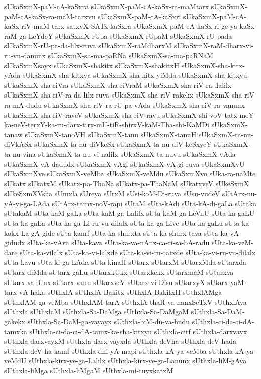 {sUkaSxmX-paM-cA-kaSxra
sUkaSxmX-paM-cA-kaSx-ra-maMtarx
sUkaSxmX-paM-cA-kaSx-ra-maM-tarxvu
sUkaSxmX-paM-cA-kaSxri
sUkaSxmX-paM-cA-kaSx-riV-maM-tarx-satxvX-SATx-kaSxra
sUkaSxmX-paM-cA-kaSx-ri-ge-ya-kaSx-raM-ga-LeYdeY
sUkaSxmX-rUpa
sUkaSxmX-rUpaM
sUkaSxmX-rU-pada
sUkaSxmX-rU-pa-da-lilx-ruva
sUkaSxmX-raMdharxM
sUkaSxmX-raM-dharx-vi-ru-vu-danunx
sUkaSxmX-sa-ma-paRNa
sUkaSxmX-sa-ma-paRNaM
sUkaSxmXsayx
sUkaSxmX-shakitx
sUkaSxmX-shakitxH
sUkaSxmX-sha-kitx-yAda
sUkaSxmX-sha-kitxya
sUkaSxmX-sha-kitx-yiMda
sUkaSxmX-sha-kitxyu
sUkaSxmX-sha-riVra
sUkaSxmX-sha-riVraM
sUkaSxmX-sha-riV-ra-dalilx
sUkaSxmX-sha-riV-ra-da-lilx-ruva
sUkaSxmX-sha-riV-rakekx
sUkaSxmX-sha-riV-ra-mA-dudu
sUkaSxmX-sha-riV-ra-rU-pa-vAda
sUkaSxmX-sha-riV-ra-vanunx
sUkaSxmX-sha-riV-raveV
sUkaSxmX-sha-riV-ravu
sUkaSxmX-shi-voV-tatx-meY-ka-neV-terxY-ka-ru-darx-tirx-mU-tiR-shirxV-kaM-Tha-shi-KaMDi
sUkaSxmX-tanaw
sUkaSxmX-tanoVH
sUkaSxmX-tanu
sUkaSxmX-tanuH
sUkaSxmX-ta-nu-diVkASx
sUkaSxmX-ta-nu-diVkeSx
sUkaSxmX-ta-nu-diV-keSxyeY
sUkaSxmX-ta-nu-vina
sUkaSxmX-ta-nu-vi-nalilx
sUkaSxmX-ta-nuvu
sUkaSxmX-vAda
sUkaSxmX-vA-dadudx
sUkaSxmX-vAgi
sUkaSxmX-vA-gi-ruva
sUkaSxmXvU
sUkaSxmXve
sUkaSxmX-veMba
sUkaSxmX-veMdu
sUkaSxmXvo
sUka-ra-naMte
sUkatx
sUkatxM
sUkatx-pa-ThaNa
sUkatx-pa-ThaNaM
sUkatxveV
sUkeSxmX
sUkeSxmXVsha
sUmxla
sUreya
sUrxM
sUsi-koM-Di-ruva
sUsu-vudeV
sUtArx-nu-yA-yi-ga-LAda
sUtArx-tamx-noV-rapi
sUtaM
sUta-kAdi
sUta-kA-di-gaLa
sUtaka
sUtakaM
sUta-kaM-gaLa
sUta-kaM-ga-Lalilx
sUta-kaM-ga-LeVnU
sUta-ka-gaLU
sUta-ka-gaLa
sUta-ka-ga-Li-ru-vu-dilalx
sUta-ka-ga-Live
sUta-ka-gaLu
sUta-ka-kokx-La-gA-gide
sUta-kamf
sUta-ka-shurxta
sUta-ka-shurx-tava
sUta-ka-vA-gidudx
sUta-ka-vAru
sUta-kava
sUta-ka-va-nAnx-ca-ri-sa-bA-radu
sUta-ka-veM-dare
sUta-ka-vilalx
sUta-ka-vi-lalxde
sUta-ka-vi-ru-tatxde
sUta-ka-vi-ru-vu-dilalx
sUta-kavu
sUta-ki-ga-LAda
sUta-kinaH
sUtarx
sUtarxM
sUtarxMda
sUtarxda
sUtarx-diMda
sUtarx-gaLu
sUtarxkUkx
sUtarxkekx
sUtarxmaM
sUtarxva
sUtarx-vanUnx
sUtarx-vanu
sUtarxveV
sUtarx-vi-Disu
sUtarxyX
sUtarx-yaM-tarx-vA-haka
sUthxlA
sUthxlA-Bakitx
sUthxlA-BakitxH
sUthxlAMga
sUthxlAM-ga-veMba
sUthxlAM-tarA
sUthxlA-thaR-va-nanxSeTxV
sUthxlAya
sUthxla
sUthxlaM
sUthxla-Sa-DaMga
sUthxla-Sa-DaMgaM
sUthxla-Sa-DaM-gakekx
sUthxla-Sa-DaM-ga-vayayx
sUthxla-biM-du-va-hudu
sUthxla-ci-da-ci-dA-tamxka
sUthxla-ci-da-ci-dA-tamx-ka-sha-kitxyu
sUthxla-citf
sUthxla-darxvayx
sUthxla-darxvayxM
sUthxla-darx-vayxda
sUthxla-deVha
sUthxla-deV-hada
sUthxla-deV-ha-kamf
sUthxla-dhi-yA-mapi
sUthxla-kA-ya-veMba
sUthxla-kA-ya-veMdU
sUthxla-kirx-ye-ga-Lalilx
sUthxla-kirx-ye-ga-Lanunx
sUthxla-liM-gAya
sUthxla-liMga
sUthxla-liMgaM
sUthxla-mi-tuyxkatxM
}
